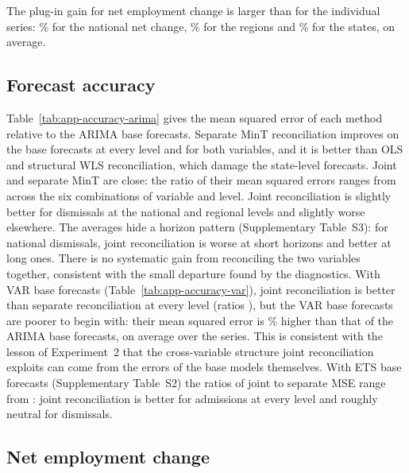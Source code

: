The plug-in gain for net employment change is larger than for the individual series: \appNetPlugTotal\% for the national net change, \appNetPlugRegions\% for the regions and \appNetPlugStates\% for the states, on average.



\subsection{Forecast accuracy}

Table~\ref{tab:app-accuracy-arima} gives the mean squared error of each method relative to the ARIMA base forecasts. Separate MinT reconciliation improves on the base forecasts at every level and for both variables, and it is better than OLS and structural WLS reconciliation, which damage the state-level forecasts. Joint and separate MinT are close: the ratio of their mean squared errors ranges from \appJointSepArimaRange{} across the six combinations of variable and level. Joint reconciliation is slightly better for dismissals at the national and regional levels and slightly worse elsewhere. The averages hide a horizon pattern (Supplementary Table~S3): for national dismissals, joint reconciliation is worse at short horizons and better at long ones. There is no systematic gain from reconciling the two variables together, consistent with the small departure found by the diagnostics. With VAR base forecasts (Table~\ref{tab:app-accuracy-var}), joint reconciliation is better than separate reconciliation at every level (ratios \appJointSepVarRange), but the VAR base forecasts are poorer to begin with: their mean squared error is \appVarVsArimaBase\% higher than that of the ARIMA base forecasts, on average over the series. This is consistent with the lesson of Experiment~2 that the cross-variable structure joint reconciliation exploits can come from the errors of the base models themselves. With ETS base forecasts (Supplementary Table~S2) the ratios of joint to separate MSE range from \appJointSepEtsRange: joint reconciliation is better for admissions at every level and roughly neutral for dismissals.




\subsection{Net employment change}

